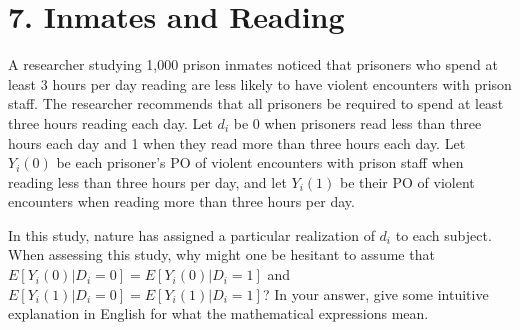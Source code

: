 \documentclass[]{article}
\begin{document}
\hypertarget{inmates-and-reading}{%
\section{7. Inmates and Reading}\label{inmates-and-reading}}

A researcher studying 1,000 prison inmates noticed that prisoners who
spend at least 3 hours per day reading are less likely to have violent
encounters with prison staff. The researcher recommends that all
prisoners be required to spend at least three hours reading each day.
Let \(d_{i}\) be 0 when prisoners read less than three hours each day
and 1 when they read more than three hours each day. Let \(Y_{i}(0)\) be
each prisoner's PO of violent encounters with prison staff when reading
less than three hours per day, and let \(Y_{i}(1)\) be their PO of
violent encounters when reading more than three hours per day.

In this study, nature has assigned a particular realization of \(d_{i}\)
to each subject. When assessing this study, why might one be hesitant to
assume that \({E[Y_{i}(0)|D_{i}=0] = E[Y_{i}(0)|D_{i}=1]}\) and
\(E{[Y_{i}(1)|D_{i}=0] = E[Y_{i}(1)|D_{i}=1]}\)? In your answer, give
some intuitive explanation in English for what the mathematical
expressions mean.
\end{document}
